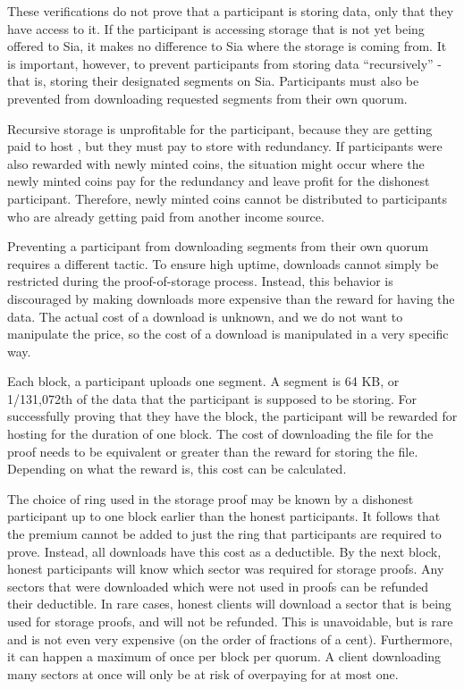 \documentclass[twocolumn]{article}
\begin{document}
These verifications do not prove that a participant is storing data, only that they have access to it.
If the participant is accessing storage that is not yet being offered to Sia, it makes no difference to Sia where the storage is coming from.
It is important, however, to prevent participants from storing data ``recursively'' - that is, storing their designated segments on Sia.
Participants must also be prevented from downloading requested segments from their own quorum.

Recursive storage is unprofitable for the participant, because they are getting paid to host \participantvolume{}, but they must pay to store \participantvolume{} with redundancy.
If participants were also rewarded with newly minted coins, the situation might occur where the newly minted coins pay for the redundancy and leave profit for the dishonest participant.
Therefore, newly minted coins cannot be distributed to participants who are already getting paid from another income source.

Preventing a participant from downloading segments from their own quorum requires a different tactic.
To ensure high uptime, downloads cannot simply be restricted during the proof-of-storage process.
Instead, this behavior is discouraged by making downloads more expensive than the reward for having the data.
The actual cost of a download is unknown, and we do not want to manipulate the price, so the cost of a download is manipulated in a very specific way.

Each block, a participant uploads one segment.
A segment is 64 KB, or 1/131,072th of the data that the participant is supposed to be storing.
For successfully proving that they have the block, the participant will be rewarded for hosting \participantvolume{} for the duration of one block.
The cost of downloading the file for the proof needs to be equivalent or greater than the reward for storing the file.
Depending on what the reward is, this cost can be calculated.

The choice of ring used in the storage proof may be known by a dishonest participant up to one block earlier than the honest participants.
It follows that the premium cannot be added to just the ring that participants are required to prove.
Instead, all downloads have this cost as a deductible.
By the next block, honest participants will know which sector was required for storage proofs.
Any sectors that were downloaded which were not used in proofs can be refunded their deductible.
In rare cases, honest clients will download a sector that is being used for storage proofs, and will not be refunded.
This is unavoidable, but is rare and is not even very expensive (on the order of fractions of a cent).
Furthermore, it can happen a maximum of once per block per quorum.
A client downloading many sectors at once will only be at risk of overpaying for at most one.
\end{document}
